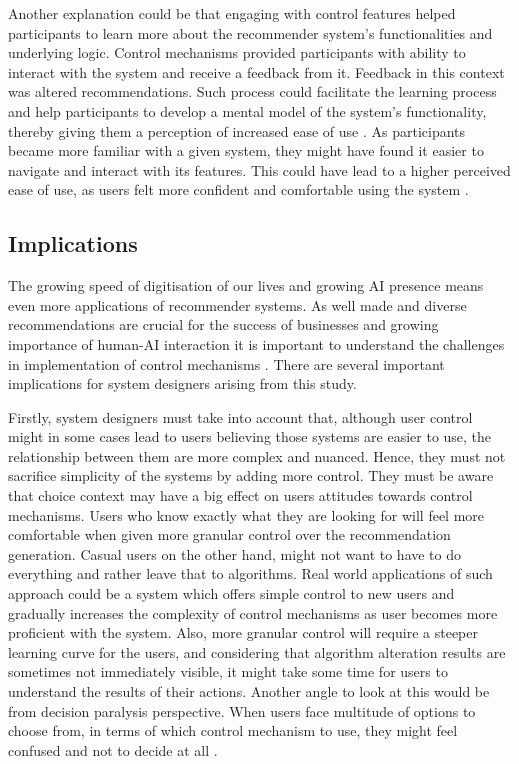 \documentclass[a4paper,12pt]{article}
\begin{document}
Another explanation could be that engaging with control features helped participants to learn more about the recommender system's functionalities and underlying logic. Control mechanisms provided participants with ability to interact with the system and receive a feedback from it. Feedback in this context was altered recommendations. Such process could facilitate the learning process and help participants to develop a mental model of the system's functionality, thereby giving them a perception of increased ease of use \citep{norman2013design}. As participants became more familiar with a given system, they might have found it easier to navigate and interact with its features. This could have lead to a higher perceived ease of use, as users felt more confident and comfortable using the system \citep{venkateshDeterminantsPerceivedEase2000}. 

\subsection{Implications}

The growing speed of digitisation of our lives and growing AI presence means even more applications of recommender systems. As well made and diverse recommendations are crucial for the success of businesses and growing importance of human-AI interaction it is important to understand the challenges in implementation of control mechanisms \citep{songWhenHowDiversify2019, dietvorstEtAl18}. There are several important implications for system designers arising from this study.

Firstly, system designers must take into account that, although user control might in some cases lead to users believing those systems are easier to use, the relationship between them are more complex and nuanced. Hence, they must not sacrifice simplicity of the systems by adding more control. They must be aware that choice context may have a big effect on users attitudes towards control mechanisms. Users who know exactly what they are looking for will feel more comfortable when given more granular control over the recommendation generation. Casual users on the other hand, might not want to have to do everything and rather leave that to algorithms. Real world applications of such approach could be a system which offers simple control to new users and gradually increases the complexity of control mechanisms as user becomes more proficient with the system. Also, more granular control will require a steeper learning curve for the users, and considering that algorithm alteration results are sometimes not immediately visible, it might take some time for users to understand the results of their actions. Another angle to look at this would be from decision paralysis perspective. When users face multitude of options to choose from, in terms of which control mechanism to use, they might feel confused and not to decide at all \citep{schwartz2004paradox}.
\end{document}
